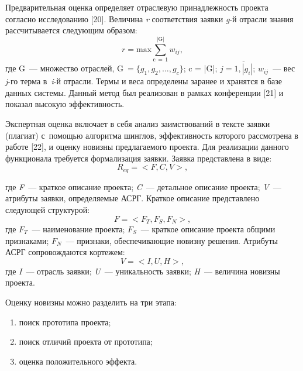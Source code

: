 Предварительная оценка определяет отраслевую принадлежность проекта согласно исследованию [20]. Величина \textit{r} соответствия заявки \textit{g}-й отрасли знания рассчитывается следующим образом:
\begin{equation}
  r = \text{max}\sum_{\text{c}\,=\,1}^{|\text{G}|}{w_{ij}},
\end{equation}
где G~--- множество отраслей, $\text{G}~= \{g_1, g_2,\dots, g_c \}$; c = |G|; $j=\overline{1,|g_i|}$; $w_{ij}$~--- вес \textit{j}-го терма в~\textit{i}-й отрасли. Термы и веса определены заранее и хранятся в базе данных системы. Данный метод был реализован в рамках конференции [21] и показал высокую эффективность.

Экспертная оценка включает в себя анализ заимствований в тексте заявки (плагиат) с~помощью алгоритма шинглов, эффективность которого рассмотрена в работе [22], и оценку новизны предлагаемого проекта. Для реализации данного функционала требуется формализация заявки. Заявка представлена в виде:
\begin{equation}
  R_{eq}= < F, C, V >,
\end{equation}
\enlargethispage{\baselineskip}





где \textit{F}~--- краткое описание проекта; \textit{C}~--- детальное описание проекта; \textit{V}~--- атрибуты заявки, определяемые АСРГ. Краткое описание представлено следующей структурой:
\begin{equation}
  F = < F_T, F_S, F_N >,
\end{equation}
где $F_T$~--- наименование проекта; $F_S$~--- краткое описание проекта общими признаками; $F_N$~--- признаки, обеспечивающие новизну решения. Атрибуты АСРГ сопровождаются кортежем:
\begin{equation}
  V = < I, U, H >,
\end{equation}
где \textit{I}~--- отрасль заявки; \textit{U}~--- уникальность заявки; \textit{H}~--- величина новизны проекта.

Оценку новизны можно разделить на три этапа:
\begin{enumerate}[noitemsep]\vspace{-8pt}
    \item поиск прототипа проекта;
    \item поиск отличий проекта от прототипа;
    \item оценка положительного эффекта.
\end{enumerate}\vspace{-8pt}

